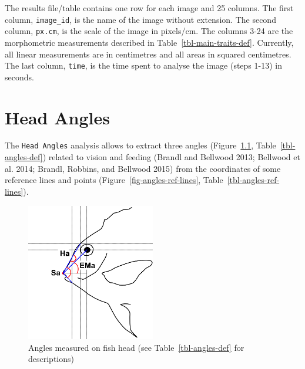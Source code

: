 \documentclass[
  letterpaper,
  DIV=11,
  numbers=noendperiod,
  oneside]{scrreprt}
\begin{document}
The results file/table contains one row for each image and 25 columns.
The first column, \texttt{image\_id}, is the name of the image without
extension. The second column, \texttt{px.cm}, is the scale of the image
in pixels/cm. The columns 3-24 are the morphometric measurements
described in Table~\ref{tbl-main-traits-def}. Currently, all linear
measurements are in centimetres and all areas in squared centimetres.
The last column, \texttt{time}, is the time spent to analyse the image
(steps 1-13) in seconds.

\hypertarget{sec-head_angles}{%
\chapter{Head Angles}\label{sec-head_angles}}

The \texttt{Head\ Angles} analysis allows to extract three angles
(Figure~\ref{fig-head-angles}, Table~\ref{tbl-angles-def}) related to
vision and feeding (Brandl and Bellwood 2013; Bellwood et al. 2014;
Brandl, Robbins, and Bellwood 2015) from the coordinates of some
reference lines and points (Figure~\ref{fig-angles-ref-lines},
Table~\ref{tbl-angles-ref-lines}).

\begin{figure}

{\centering \includegraphics[width=0.5\textwidth,height=\textheight]{./images/drawings/head_angles_sketch.png}

}

\caption{\label{fig-head-angles}Angles measured on fish head (see
Table~\ref{tbl-angles-def} for descriptions)}

\end{figure}
\end{document}
